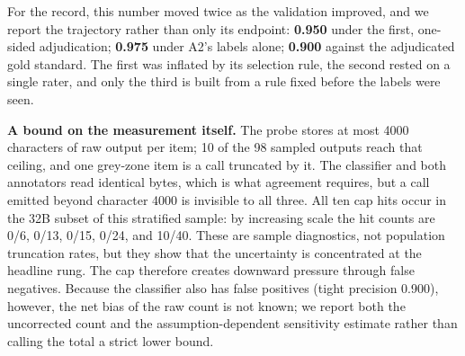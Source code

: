 For the record, this number moved twice as the validation improved, and we report the trajectory
rather than only its endpoint: \textbf{0.950} under the first, one-sided adjudication;
\textbf{0.975} under A2's labels alone; \textbf{0.900} against the adjudicated gold standard. The
first was inflated by its selection rule, the second rested on a single rater, and only the third
is built from a rule fixed before the labels were seen.

\textbf{A bound on the measurement itself.} The probe stores at most 4000 characters of raw
output per item; 10 of the 98 sampled outputs reach that ceiling, and one grey-zone item is a
call truncated by it. The classifier and both annotators read identical bytes, which is what
agreement requires, but a call emitted beyond character 4000 is invisible to all three.
All ten cap hits occur in the 32B subset of this stratified sample: by increasing scale the
hit counts are 0/6, 0/13, 0/15, 0/24, and 10/40. These are sample diagnostics, not population
truncation rates, but they show that the uncertainty is concentrated at the headline rung.
The cap therefore creates downward pressure through false negatives. Because the classifier also
has false positives (tight precision 0.900), however, the net bias of the raw count is not known;
we report both the uncorrected count and the assumption-dependent sensitivity estimate rather than calling
the total a strict lower bound.

